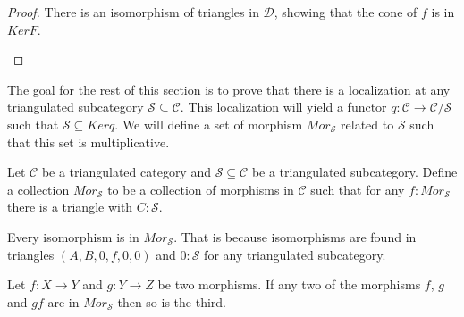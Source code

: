     \begin{proof}
        There is an isomorphism of triangles in $\mathcal{D}$, showing that the cone of $f$ is in $KerF$.
        \begin{center}
        \end{center}
    \end{proof}

    The goal for the rest of this section is to prove that there is a localization at any triangulated subcategory $\mathcal{S}\subseteq\mathcal{C}$. This localization will yield a functor $q:\mathcal{C}\rightarrow \mathcal{C}/\mathcal{S}$ such that $\mathcal{S}\subseteq Kerq$. We will define a set of morphism $Mor_\mathcal{S}$ related to $\mathcal{S}$ such that this set is multiplicative.

    \begin{definition}
        Let $\mathcal{C}$ be a triangulated category and $\mathcal{S} \subseteq \mathcal{C}$ be a triangulated subcategory. Define a collection $Mor_{\mathcal{S}}$ to be a collection of morphisms in $\mathcal{C}$ such that for any $f : Mor_{\mathcal{S}}$ there is a triangle with $C : \mathcal{S}$.
        \begin{center}
        \end{center}
    \end{definition}

    \begin{remark}
        Every isomorphism is in $Mor_{\mathcal{S}}$. That is because isomorphisms are found in triangles $(A,B,0,f,0,0)$ and $0 : \mathcal{S}$ for any triangulated subcategory.
    \end{remark}

    \begin{lemma}
        Let $f : X \rightarrow Y$ and $g : Y \rightarrow Z$ be two morphisms. If any two of the morphisms $f$, $g$ and $gf$ are in $Mor_{\mathcal{S}}$ then so is the third.
    \end{lemma}

